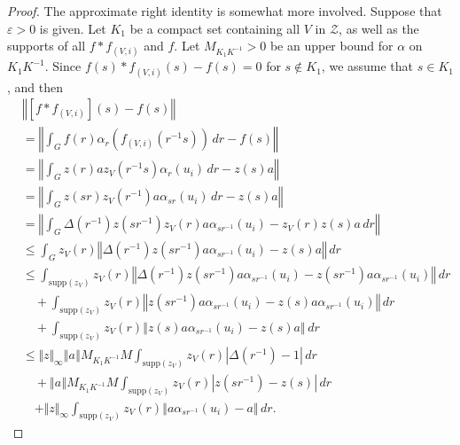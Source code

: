 \documentclass{amsart}
\theoremstyle{plain}
\theoremstyle{definition}
\numberwithin{equation}{section}
\begin{document}
\begin{proof}
The approximate right identity is somewhat more involved. Suppose that ${\varepsilon}>0$ is given. Let $K_1$ be a compact set containing all $V$ in $\mathcal Z$, as well as the supports of all $f*f_{(V,i)}$ and $f$. Let $M_{K_1 K^{-1}}>0$ be an upper bound for $\alpha$ on $K_1 K^{-1}$. Since $f(s) * f_{(V,i)} (s)- f(s)=0$ for $s\notin K_1$, we assume that $s\in K_1$, and then
\begin{align*}
&{\left\Vert { [f * f_{(V,i)}](s) - f(s)} \right\Vert} \\
&= {\left\Vert {\int_G f(r) \alpha_r(f_{(V,i)}(r^{-1}s)) \,dr - f(s)} \right\Vert} \\
&= {\left\Vert {\int_G z(r)a z_V(r^{-1}s)\alpha_r(u_i)\,dr - z(s)a} \right\Vert} \\
&= {\left\Vert {\int_G z(sr) z_V(r^{-1}) a \alpha_{sr}(u_i) \,dr - z(s)a} \right\Vert} \\
&= {\left\Vert {\int_G \Delta(r^{-1}) z(sr^{-1})z_V(r) a \alpha_{sr^{-1}}(u_i) - z_V(r) z(s)a \, dr} \right\Vert} \\
&\leq \int_G z_V(r) {\left\Vert {\Delta(r^{-1})z(sr^{-1}) a \alpha_{sr^{-1}}(u_i) - z(s)a} \right\Vert} \,dr \\
&\leq \int_{{\text{supp}}(z_V)} z_V(r)  {\left\Vert {\Delta(r^{-1})z(sr^{-1}) a \alpha_{sr^{-1}}(u_i) - z(sr^{-1}) a \alpha_{sr^{-1}}(u_i)} \right\Vert}\,dr \\
&\quad + \int_{{\text{supp}}(z_V)} z_V(r) {\left\Vert {z(sr^{-1}) a \alpha_{sr^{-1}}(u_i) - z(s)a \alpha_{sr^{-1}}(u_i)} \right\Vert} \,dr \\
&\quad + \int_{{\text{supp}}(z_V)} z_V(r) {\left\Vert {z(s)a \alpha_{sr^{-1}}(u_i) - z(s)a} \right\Vert} \,dr\\
&\leq \Vert z\Vert_\infty{\left\Vert {a} \right\Vert} M_{K_1 K^{-1}} M \int_{{\text{supp}}(z_V)} z_V(r)  |\Delta(r^{-1})-1|\,dr \\
&\quad + {\left\Vert {a} \right\Vert} M_{K_1 K^{-1}} M \int_{{\text{supp}}(z_V)} z_V(r) |z(sr^{-1})-z(s)|\,dr\\
&\quad + \Vert z\Vert_\infty \int_{{\text{supp}}(z_V)} z_V(r) {\left\Vert {a \alpha_{sr^{-1}}(u_i) - a} \right\Vert} \,dr.
 \end{align*}

\end{proof}
\end{document}
